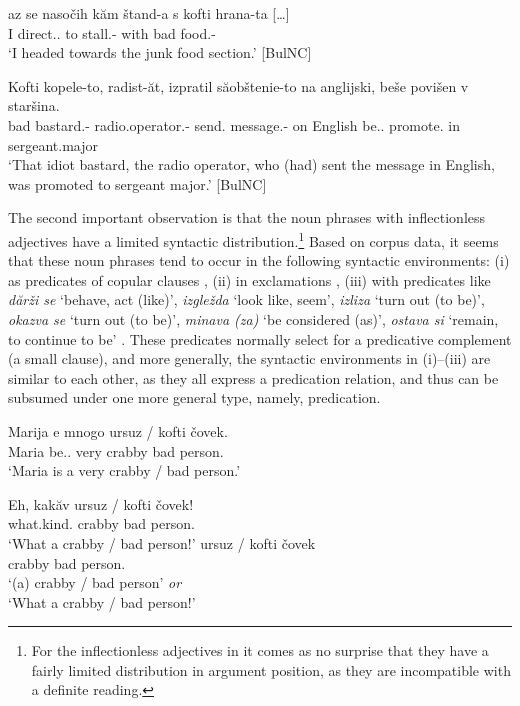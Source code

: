 \documentclass[output=paper]{langscibook}
\begin{document}
\ea \label{ge-ex-kofti1}
\gll [\ldots{}] az se naso\v{c}ih k\u{a}m \v{s}tand-a s kofti hrana-ta [\ldots{}] \\
{} I \Refl{} direct.\Pst{}.\Fsg{} to stall.\M{}-\Def{} with bad food.\F{}-\Def{} {}\\
\glt `I headed towards the junk food section.' \hfill [BulNC]
\z 

\ea \label{ge-ex-kofti2}
\gll Kofti kopele-to, radist-\u{a}t, izpratil s\u{a}ob\v{s}tenie-to na anglijski, be\v{s}e povi\v{s}en v star\v{s}ina. \\
bad bastard.\N{}-\Def{} radio.operator.\M{}-\Def{} send.\Ptcp{} message.\N{}-\Def{} on English be.\Pst{}.\Tsg{} promote.\Ptcp{} in sergeant.major\\
\glt `That idiot bastard, the radio operator, who (had) sent the message in English, was promoted to sergeant major.' \hfill [BulNC]
\z


\noindent The second important observation is that
the noun phrases with inflectionless adjectives have a limited syntactic distribution.\footnote{For the inflectionless adjectives in  it comes as no surprise that they have a fairly limited distribution in argument position, as they are incompatible with a definite reading.} Based on corpus data, it seems that these noun phrases tend to occur in the following syntactic environments: (i) as predicates of copular clauses , (ii) in exclamations , (iii) with predicates like \emph{d\u{a}r\v{z}i se} `behave, act (like)', \emph{izgle\v{z}da} `look like, seem', \emph{izliza} `turn out (to be)', \emph{okazva se} `turn out (to be)', \emph{minava (za)} `be considered (as)', \emph{ostava si} `remain, to continue to be' . These predicates normally select for a predicative complement (a small clause), and more generally, the syntactic environments in (i)--(iii) are similar to each other, as they all express a predication relation, and thus can be subsumed under one more general type, namely, predication.

\ea \label{ge-ex-pred}
\gll  Marija e mnogo ursuz / kofti \v{c}ovek.\\
Maria be.\Prs{}.\Tsg{} very crabby {} bad person.\M{}\\
\glt `Maria is a very crabby / bad person.'
\z

\ea \label{ge-ex-excl0}
\ea \label{ge-ex-excl1}
\gll Eh, kak\u{a}v ursuz / kofti \v{c}ovek!\\
\Prt{} what.kind.\M{} crabby {} bad person.\M{} \\
\glt `What a crabby / bad person!'
\ex \label{ge-ex-ecl2}
\gll ursuz / kofti \v{c}ovek\\
crabby {} bad person.\M{}\\
\glt `(a) crabby / bad person' \emph{or}\\
`What a crabby / bad person!'
\z
\z
\end{document}

